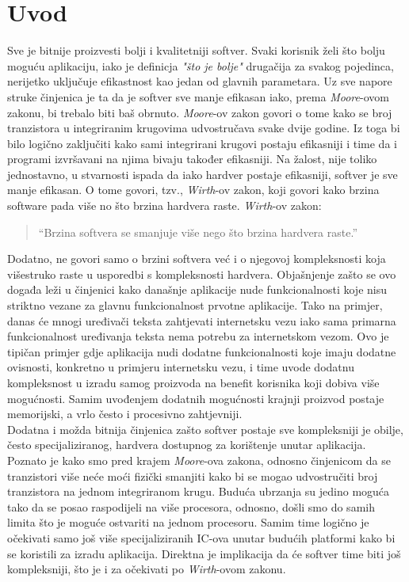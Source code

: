 \chapter{Uvod}

Sve je bitnije proizvesti bolji i kvalitetniji softver. Svaki korisnik želi što bolju moguću aplikaciju, iako je definicja \textit{"što je bolje"} drugačija za svakog pojedinca, nerijetko uključuje efikastnost kao jedan od glavnih parametara. Uz sve napore struke činjenica je ta da je softver sve manje efikasan iako, prema \textit{Moore}-ovom zakonu\cite{mooresLaw}, bi trebalo biti baš obrnuto. \textit{Moore}-ov zakon govori o tome kako se broj tranzistora u integriranim krugovima udvostručava svake dvije godine. Iz toga bi bilo logično zaključiti kako sami integrirani krugovi postaju efikasniji i time da i programi izvršavani na njima bivaju također efikasniji. Na žalost, nije toliko jednostavno, u stvarnosti ispada da iako hardver postaje efikasniji, softver je sve manje efikasan. O tome govori, tzv., \textit{Wirth}-ov zakon, koji govori kako brzina software pada više no što brzina hardvera raste. \textit{Wirth}-ov zakon:
\begin{quote}
    ``Brzina softvera se smanjuje više nego što brzina hardvera raste.''\cite{wirthsLaw} \\
\end{quote}
Dodatno, ne govori samo o brzini softvera već i o njegovoj kompleksnosti koja višestruko raste u usporedbi s kompleksnosti hardvera. Objašnjenje zašto se ovo događa leži u činjenici kako današnje aplikacije nude funkcionalnosti koje nisu striktno vezane za glavnu funkcionalnost prvotne aplikacije. Tako na primjer, danas će mnogi uređivači teksta zahtjevati internetsku vezu iako sama primarna funkcionalnost uređivanja teksta nema potrebu za internetskom vezom. Ovo je tipičan primjer gdje aplikacija nudi dodatne funkcionalnosti koje imaju dodatne ovisnosti, konkretno u primjeru internetsku vezu, i time uvode dodatnu kompleksnost u izradu samog proizvoda na benefit korisnika koji dobiva više mogućnosti. Samim uvođenjem dodatnih mogućnosti krajnji proizvod postaje memorijski, a vrlo često i procesivno zahtjevniji. \\ 

Dodatna i možda bitnija činjenica zašto softver postaje sve kompleksniji je obilje, često specijaliziranog, hardvera dostupnog za korištenje unutar aplikacija. Poznato je kako smo pred krajem \textit{Moore}-ova zakona, odnosno činjenicom da se tranzistori više neće moći fizički smanjiti kako bi se mogao udvostručiti broj tranzistora na jednom integriranom krugu. Buduća ubrzanja su jedino moguća tako da se posao raspodijeli na više procesora, odnosno, došli smo do samih limita što je moguće ostvariti na jednom procesoru. Samim time logično je očekivati samo još više specijaliziranih IC-ova unutar budućih platformi kako bi se koristili za izradu aplikacija. Direktna je implikacija da će softver time biti još kompleksniji, što je i za očekivati po \textit{Wirth}-ovom zakonu. \\ 


